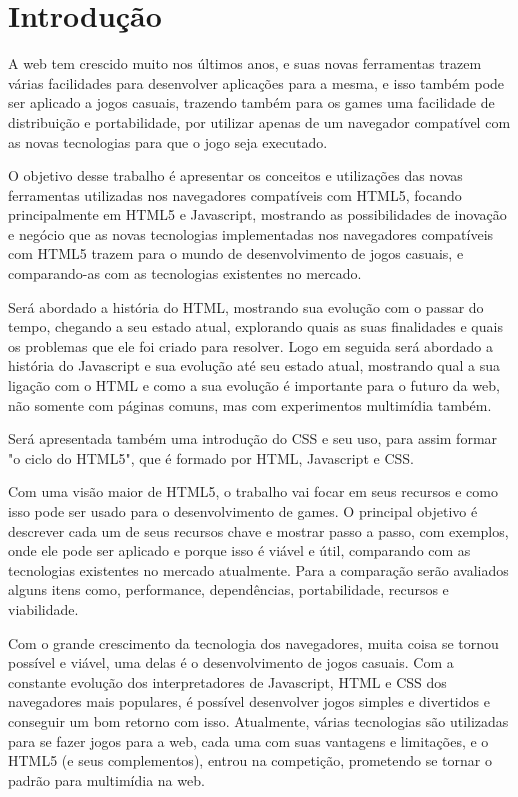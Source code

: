 \section{Introdução}

A web tem crescido muito nos últimos anos, e suas novas ferramentas trazem várias
facilidades para desenvolver aplicações para a mesma, e isso também pode ser aplicado
a jogos casuais, trazendo também para os games uma facilidade de distribuição e portabilidade,
por utilizar apenas de um navegador compatível com as novas tecnologias
para que o jogo seja executado.

O objetivo desse trabalho é apresentar os conceitos e utilizações das novas ferramentas utilizadas
nos navegadores compatíveis com HTML5, focando principalmente em HTML5
e Javascript, mostrando as possibilidades de inovação e negócio que as novas tecnologias implementadas
nos navegadores compatíveis com HTML5 trazem para o mundo de
desenvolvimento de jogos casuais, e comparando-as com as tecnologias existentes no mercado.

Será abordado a história do HTML, mostrando sua evolução com o passar do tempo, chegando
a seu estado atual, explorando quais as suas finalidades e quais os problemas que ele foi criado para resolver.
Logo em seguida será abordado a história do Javascript e sua evolução até seu estado
atual, mostrando qual a sua ligação com o HTML e como a sua evolução é importante
para o futuro da web, não somente com páginas comuns, mas com experimentos multimídia também.

Será apresentada também uma introdução do CSS e seu uso, para assim formar "o ciclo
do HTML5", que é formado por HTML, Javascript e CSS.

Com uma visão maior de HTML5, o trabalho vai focar em seus recursos e como isso pode
ser usado para o desenvolvimento de games. O principal objetivo é descrever cada um de seus recursos
chave e mostrar passo a passo, com exemplos, onde ele pode ser aplicado e porque isso
é viável e útil, comparando com as tecnologias existentes no mercado atualmente. Para
a comparação serão avaliados alguns itens como, performance, dependências, portabilidade, recursos e viabilidade.

Com o grande crescimento da tecnologia dos navegadores, muita coisa se tornou possível
e viável, uma delas é o desenvolvimento de jogos casuais. Com a constante evolução
dos interpretadores de Javascript, HTML e CSS dos navegadores mais populares, é possível
desenvolver jogos simples e divertidos e conseguir um bom retorno com isso. Atualmente,
várias tecnologias são utilizadas para se fazer jogos para a web, cada uma com suas
vantagens e limitações, e o HTML5 (e seus complementos), entrou na competição, prometendo
se tornar o padrão para multimídia na web.

